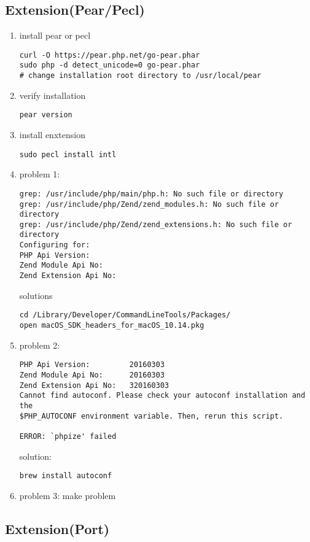     \subsection{Extension(Pear/Pecl)}
        \begin{enumerate}
            \item install \colorbox{gray!30}{pear} or \colorbox{gray!30}{pecl} 
                \begin{lstlisting}
curl -O https://pear.php.net/go-pear.phar
sudo php -d detect_unicode=0 go-pear.phar
# change installation root directory to /usr/local/pear
                \end{lstlisting}
            \item verify installation
                \begin{lstlisting}
pear version
                \end{lstlisting}
            \item install enxtension
                \begin{lstlisting}
sudo pecl install intl
                \end{lstlisting}
            \item problem 1:
                \begin{lstlisting}
grep: /usr/include/php/main/php.h: No such file or directory
grep: /usr/include/php/Zend/zend_modules.h: No such file or directory
grep: /usr/include/php/Zend/zend_extensions.h: No such file or directory
Configuring for:
PHP Api Version:
Zend Module Api No:
Zend Extension Api No:
                \end{lstlisting}
                solutions
                \begin{lstlisting}
cd /Library/Developer/CommandLineTools/Packages/
open macOS_SDK_headers_for_macOS_10.14.pkg
                \end{lstlisting}
            \item problem 2:
                \begin{lstlisting}
PHP Api Version:         20160303
Zend Module Api No:      20160303
Zend Extension Api No:   320160303
Cannot find autoconf. Please check your autoconf installation and the
$PHP_AUTOCONF environment variable. Then, rerun this script.

ERROR: `phpize' failed
                \end{lstlisting}
                solution:
                \begin{lstlisting}
brew install autoconf
                \end{lstlisting}
            
            \item problem 3:
            make problem
        \end{enumerate}
        
    \subsection{Extension(Port)}